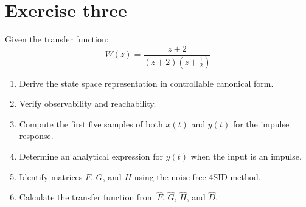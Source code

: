 \section{Exercise three}

Given the transfer function:
\[W(z)=\dfrac{z+2}{\left(z+2\right)\left(z+\frac{1}{2}\right)}\]
\begin{enumerate}
    \item Derive the state space representation in controllable canonical form.
    \item Verify observability and reachability.
    \item Compute the first five samples of both $x(t)$ and $y(t)$ for the impulse response.
    \item Determine an analytical expression for $y(t)$ when the input is an impulse.
    \item Identify matrices $F$, $G$, and $H$ using the noise-free 4SID method.
    \item Calculate the transfer function from $\hat{F}$, $\hat{G}$, $\hat{H}$, and $\hat{D}$.
\end{enumerate}

